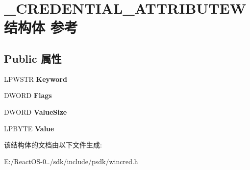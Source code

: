 \hypertarget{struct___c_r_e_d_e_n_t_i_a_l___a_t_t_r_i_b_u_t_e_w}{}\section{\+\_\+\+C\+R\+E\+D\+E\+N\+T\+I\+A\+L\+\_\+\+A\+T\+T\+R\+I\+B\+U\+T\+E\+W结构体 参考}
\label{struct___c_r_e_d_e_n_t_i_a_l___a_t_t_r_i_b_u_t_e_w}
\subsection*{Public 属性}
\begin{DoxyCompactItemize}
\item 
\mbox{\label{struct___c_r_e_d_e_n_t_i_a_l___a_t_t_r_i_b_u_t_e_w_a6bceaa226d5f5a11e7a13fdce0d105e9}} 
L\+P\+W\+S\+TR {\bfseries Keyword}
\item 
\mbox{\label{struct___c_r_e_d_e_n_t_i_a_l___a_t_t_r_i_b_u_t_e_w_a81840f4e17af56f5e687079aff1fe5de}} 
D\+W\+O\+RD {\bfseries Flags}
\item 
\mbox{\label{struct___c_r_e_d_e_n_t_i_a_l___a_t_t_r_i_b_u_t_e_w_a9560624e9302b569f109db166bf5226a}} 
D\+W\+O\+RD {\bfseries Value\+Size}
\item 
\mbox{\label{struct___c_r_e_d_e_n_t_i_a_l___a_t_t_r_i_b_u_t_e_w_a7cd853401b9f020e0b870e19dc1cf4e5}} 
L\+P\+B\+Y\+TE {\bfseries Value}
\end{DoxyCompactItemize}


该结构体的文档由以下文件生成\+:\begin{DoxyCompactItemize}
\item 
E\+:/\+React\+O\+S-\/0../sdk/include/psdk/wincred.\+h\end{DoxyCompactItemize}
